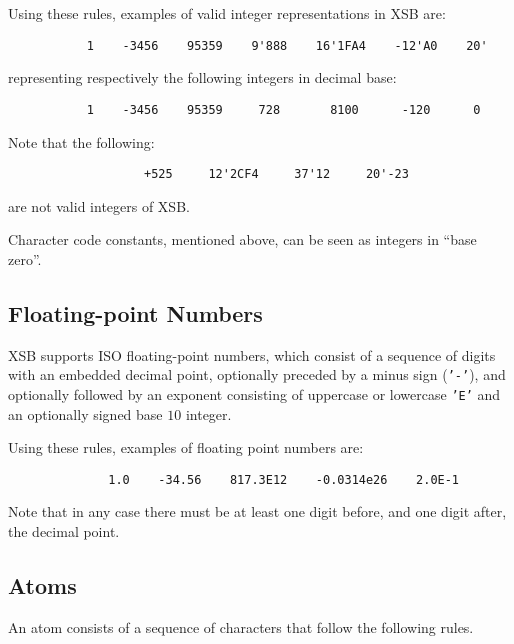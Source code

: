 Using these rules, examples of valid integer representations in XSB are:
\begin{verbatim}
           1    -3456    95359    9'888    16'1FA4    -12'A0    20'
\end{verbatim}
representing respectively the following integers in decimal base:
\begin{verbatim}
           1    -3456    95359     728       8100      -120      0
\end{verbatim}

Note that the following:
\begin{verbatim}
                   +525     12'2CF4     37'12     20'-23
\end{verbatim}
are not valid integers of XSB.

Character code constants, mentioned above, can be seen as integers in ``base zero''.



\subsection{Floating-point Numbers}
XSB supports ISO floating-point numbers, which consist of a sequence
of digits with an embedded decimal point, optionally preceded by a
minus sign ({\tt '-'}), and optionally followed by an exponent
consisting of uppercase or lowercase {\tt 'E'} and an optionally
signed base $10$ integer.

Using these rules, examples of floating point numbers are:
\begin{verbatim}
              1.0    -34.56    817.3E12    -0.0314e26    2.0E-1
\end{verbatim}
Note that in any case there must be at least one digit before, and one digit
after, the decimal point.


\subsection{Atoms} \label{sec:atoms}
An atom consists of a sequence of characters that follow the following rules.

